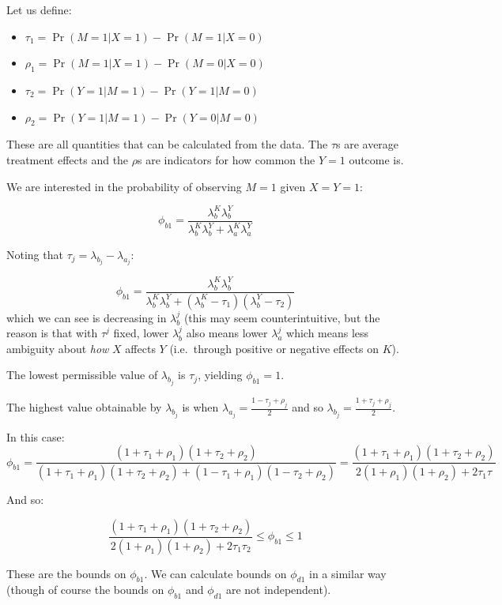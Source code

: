 \documentclass[12pt,]{book}
\providecommand{\tightlist}{%
  \setlength{\itemsep}{0pt}\setlength{\parskip}{0pt}}
\begin{document}
Let us define:

\begin{itemize}
\tightlist
\item
  \(\tau_1 = \Pr(M=1 | X=1) - \Pr(M=1 | X=0)\)
\item
  \(\rho_1 = \Pr(M=1 | X=1) - \Pr(M=0 | X=0)\)
\item
  \(\tau_2 = \Pr(Y=1 | M=1) - \Pr(Y=1 | M=0)\)
\item
  \(\rho_2 = \Pr(Y=1 | M=1) - \Pr(Y=0 | M=0)\)
\end{itemize}

These are all quantities that can be calculated from the data. The \(\tau\)s are average treatment effects and the \(\rho\)s are indicators for how common the \(Y=1\) outcome is.

We are interested in the probability of observing \(M=1\) given \(X=Y=1\):

\[\phi_{b1} = \frac{\lambda_{b}^K\lambda_{b}^Y}{\lambda_{b}^K\lambda_{b}^Y + \lambda_{a}^K\lambda_{a}^Y}\]

Noting that \(\tau_j = \lambda_{b_j} - \lambda_{a_j}\):

\[\phi_{b1} = \frac{\lambda_{b}^K\lambda_{b}^Y}{\lambda_{b}^K\lambda_{b}^Y + (\lambda_{b}^K-\tau_1)(\lambda_{b}^Y - \tau_2)}\]
which we can see is decreasing in \(\lambda_{b}^j\) (this may seem counterintuitive, but the reason is that with \(\tau^j\) fixed, lower \(\lambda_{b}^j\) also means lower \(\lambda_{a}^j\) which means less ambiguity about \emph{how} \(X\) affects \(Y\) (i.e.~through positive or negative effects on \(K\)).

The lowest permissible value of \(\lambda_{b_j}\) is \(\tau_j\), yielding \(\phi_{b1} = 1\).

The highest value obtainable by \(\lambda_{b_j}\) is when \(\lambda_{a_j} = \frac{1-\tau_j+\rho_j}2\) and so \(\lambda_{b_j} = \frac{1+\tau_j+\rho_j}2\).

In this case:
\[\phi_{b1} = \frac{(1+\tau_1+\rho_1)(1+\tau_2+\rho_2)}{(1+\tau_1+\rho_1)(1+\tau_2+\rho_2) + (1-\tau_1+\rho_1)(1-\tau_2+\rho_2)}= \frac{(1+\tau_1+\rho_1)(1+\tau_2+\rho_2)}{2(1+\rho_1)(1+\rho_2) + 2\tau_1\tau}\]

And so:

\[\frac{(1+\tau_1+\rho_1)(1+\tau_2+\rho_2)}{2(1+\rho_1)(1+\rho_2) + 2\tau_1\tau_2} \leq \phi_{b1} \leq 1\]

These are the bounds on \(\phi_{b1}\). We can calculate bounds on \(\phi_{d1}\) in a similar way (though of course the bounds on \(\phi_{b1}\) and \(\phi_{d1}\) are not independent).
\end{document}
